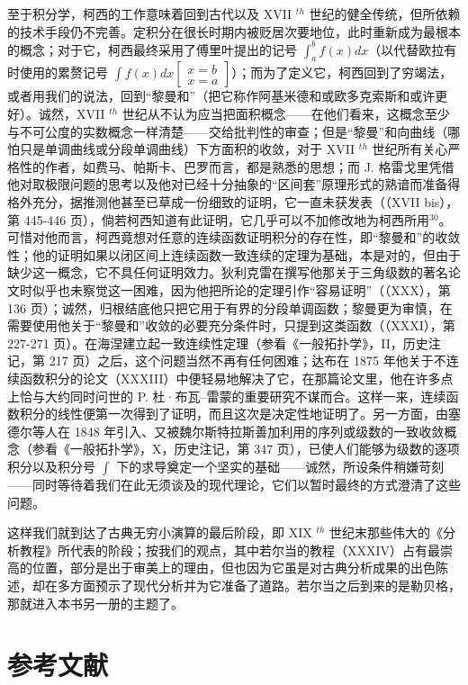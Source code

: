 至于积分学，柯西的工作意味着回到古代以及 XVII \(^{th}\) 世纪的健全传统，但所依赖的技术手段仍不完善。定积分在很长时期内被贬居次要地位，此时重新成为最根本的概念；对于它，柯西最终采用了傅里叶提出的记号 \(\int_{a}^{b} f(x) dx\)（以代替欧拉有时使用的累赘记号 \(\int f(x) dx \left[ \begin{array}{c} x = b \\ x = a \end{array} \right]\)）；而为了定义它，柯西回到了穷竭法，或者用我们的说法，回到“黎曼和”（把它称作阿基米德和或欧多克索斯和或许更好）。诚然，XVII \(^{th}\) 世纪从不认为应当把面积概念——在他们看来，这概念至少与不可公度的实数概念一样清楚——交给批判性的审查；但是“黎曼”和向曲线（哪怕只是单调曲线或分段单调曲线）下方面积的收敛，对于 XVII \(^{th}\) 世纪所有关心严格性的作者，如费马、帕斯卡、巴罗而言，都是熟悉的思想；而 J. 格雷戈里凭借他对取极限问题的思考以及他对已经十分抽象的“区间套”原理形式的熟谙而准备得格外充分，据推测他甚至已草成一份细致的证明，它一直未获发表（（XVII bis），第 445-446 页），倘若柯西知道有此证明，它几乎可以不加修改地为柯西所用\(^{30}\)。可惜对他而言，柯西竟想对任意的连续函数证明积分的存在性，即“黎曼和”的收敛性；他的证明如果以闭区间上连续函数一致连续的定理为基础，本是对的，但由于缺少这一概念，它不具任何证明效力。狄利克雷在撰写他那关于三角级数的著名论文时似乎也未察觉这一困难，因为他把所论的定理引作“容易证明”（（XXX），第 136 页）；诚然，归根结底他只把它用于有界的分段单调函数；黎曼更为审慎，在需要使用他关于“黎曼和”收敛的必要充分条件时，只提到这类函数（（XXXI），第 227-271 页）。在海涅建立起一致连续性定理（参看《一般拓扑学》，II，历史注记，第 217 页）之后，这个问题当然不再有任何困难；达布在 1875 年他关于不连续函数积分的论文（XXXIII）中便轻易地解决了它，在那篇论文里，他在许多点上恰与大约同时问世的 P. 杜·布瓦–雷蒙的重要研究不谋而合。这样一来，连续函数积分的线性便第一次得到了证明，而且这次是决定性地证明了。另一方面，由塞德尔等人在 1848 年引入、又被魏尔斯特拉斯善加利用的序列或级数的一致收敛概念（参看《一般拓扑学》，X，历史注记，第 347 页），已使人们能够为级数的逐项积分以及积分号 \(\int\) 下的求导奠定一个坚实的基础——诚然，所设条件稍嫌苛刻——同时等待着我们在此无须谈及的现代理论，它们以暂时最终的方式澄清了这些问题。

这样我们就到达了古典无穷小演算的最后阶段，即 XIX \(^{th}\) 世纪末那些伟大的《分析教程》所代表的阶段；按我们的观点，其中若尔当的教程（XXXIV）占有最崇高的位置，部分是出于审美上的理由，但也因为它虽是对古典分析成果的出色陈述，却在多方面预示了现代分析并为它准备了道路。若尔当之后到来的是勒贝格，那就进入本书另一册的主题了。

\section*{参考文献}
{}

